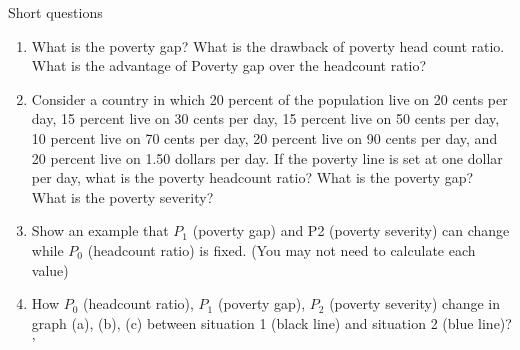 \begin{homeworkProblem}{Short questions}

    \begin{enumerate}
        \item What is the poverty gap? What is the drawback of poverty head 
        count ratio. What is the advantage of Poverty gap over the headcount 
        ratio?
        \item Consider a country in which 20 percent of the population live on 
        20 cents per day, 15 percent live on 30 cents per day, 15 percent live 
        on 50 cents per day, 10 percent live on 70 cents per day, 20 percent 
        live on 90 cents per day, and 20 percent live on 1.50 dollars per day. 
        If the poverty line is set at one dollar per day, what is the poverty 
        headcount ratio? What is the poverty gap? What is the poverty severity?
        \item Show an example that $P_1$ (poverty gap) and P2 (poverty 
        severity) can change while $P_0$ (headcount ratio) is fixed. (You may 
        not need to calculate each value)
        \item How $P_0$ (headcount ratio), $P_1$ (poverty gap), $P_2$ (poverty 
        severity) change in graph (a), (b), (c) between situation 1 (black 
        line) and situation 2 (blue line)?
'    \end{enumerate}

\end{homeworkProblem}